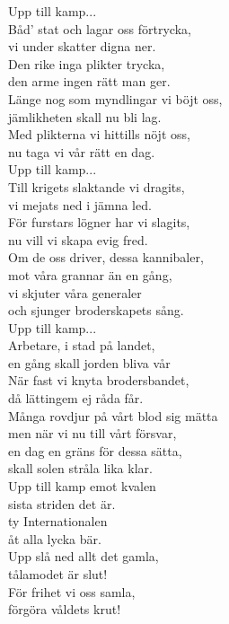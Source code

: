 \documentclass[a6paper,10pt]{article}
\begin{document}
\begin{lyrics}
Upp till kamp... \\
\newline
Båd' stat och lagar oss förtrycka, \\
vi under skatter digna ner. \\
Den rike inga plikter trycka, \\
den arme ingen rätt man ger. \\
Länge nog som myndlingar vi böjt oss, \\
jämlikheten skall nu bli lag. \\
Med plikterna vi hittills nöjt oss, \\
nu taga vi vår rätt en dag. \\
\newline
Upp till kamp... \\
\newline
Till krigets slaktande vi dragits, \\
vi mejats ned i jämna led. \\
För furstars lögner har vi slagits, \\
nu vill vi skapa evig fred. \\
Om de oss driver, dessa kannibaler, \\
mot våra grannar än en gång, \\
vi skjuter våra generaler \\
och sjunger broderskapets sång. \\
\newpage
\setlength{\oddsidemargin}{-0.47in}
\noindent
Upp till kamp... \\
\newline
Arbetare, i stad på landet, \\
en gång skall jorden bliva vår\\ 
När fast vi knyta brodersbandet, \\
då lättingem ej råda får. \\
Många rovdjur på vårt blod sig mätta \\
men när vi nu till vårt försvar, \\
en dag en gräns för dessa sätta,\\ 
skall solen stråla lika klar. \\
\newline
Upp till kamp emot kvalen \\
sista striden det är. \\
ty Internationalen \\
åt alla lycka bär. \\
Upp slå ned allt det gamla,\\
tålamodet är slut!\\
För frihet vi oss samla,\\
förgöra våldets krut!
\end{lyrics}
\end{document}
